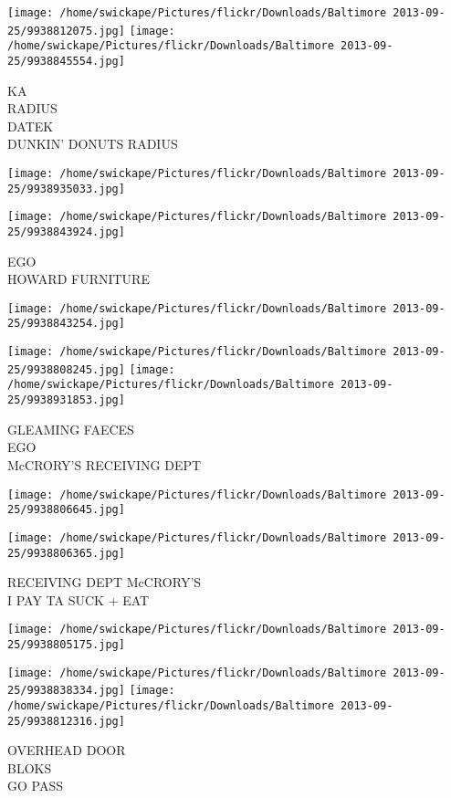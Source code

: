 \documentclass[10pt,letterpaper]{article}
\begin{document}
\texttt{[image: /home/swickape/Pictures/flickr/Downloads/Baltimore 2013-09-25/9938812075.jpg]}
\texttt{[image: /home/swickape/Pictures/flickr/Downloads/Baltimore 2013-09-25/9938845554.jpg]}

KA\\
RADIUS\\
DATEK\\
DUNKIN' DONUTS RADIUS
\pagebreak

\texttt{[image: /home/swickape/Pictures/flickr/Downloads/Baltimore 2013-09-25/9938935033.jpg]}

\vspace{0.25in}
\texttt{[image: /home/swickape/Pictures/flickr/Downloads/Baltimore 2013-09-25/9938843924.jpg]}

EGO\\
HOWARD FURNITURE
\pagebreak

\texttt{[image: /home/swickape/Pictures/flickr/Downloads/Baltimore 2013-09-25/9938843254.jpg]}

\vspace{0.25in}
\texttt{[image: /home/swickape/Pictures/flickr/Downloads/Baltimore 2013-09-25/9938808245.jpg]}
\texttt{[image: /home/swickape/Pictures/flickr/Downloads/Baltimore 2013-09-25/9938931853.jpg]}

GLEAMING FAECES\\
EGO\\
McCRORY'S RECEIVING DEPT
\pagebreak

\texttt{[image: /home/swickape/Pictures/flickr/Downloads/Baltimore 2013-09-25/9938806645.jpg]}

\vspace{0.25in}
\texttt{[image: /home/swickape/Pictures/flickr/Downloads/Baltimore 2013-09-25/9938806365.jpg]}

RECEIVING DEPT McCRORY'S\\
I PAY TA SUCK + EAT
\pagebreak

\texttt{[image: /home/swickape/Pictures/flickr/Downloads/Baltimore 2013-09-25/9938805175.jpg]}

\vspace{0.25in}
\texttt{[image: /home/swickape/Pictures/flickr/Downloads/Baltimore 2013-09-25/9938838334.jpg]}
\texttt{[image: /home/swickape/Pictures/flickr/Downloads/Baltimore 2013-09-25/9938812316.jpg]}

OVERHEAD DOOR\\
BLOKS\\
GO PASS
\pagebreak
\end{document}
